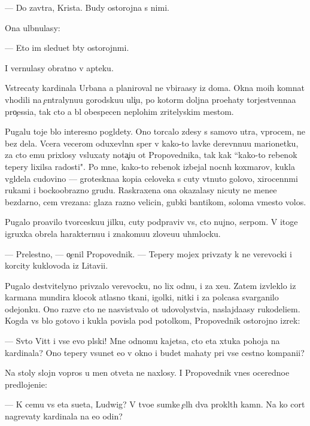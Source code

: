 \documentclass[10pt]{book}
\begin{document}
— Do zavtra, Krista. Budy ostorojna s nimi.

Ona ul{\yi}bnulasy:

— Eto im sledu{\y}et b{\yi}ty ostorojn{\yi}mi.

I vernulasy obratno v apteku.

Vstrecaty kardinala Urbana {\y}a planiroval ne v{\yi}bira{\y}asy iz doma. Okna mo{\y}ih komnat v{\yi}hodili na {\c}entralynu{\y}u gorodsku{\y}u uli{\c}u, po kotor{\yi}m doljna pro{\y}ehaty torjestvenna{\y}a pro{\c}essi{\y}a, tak cto {\y}a b{\yi}l obespecen neplohim zritelyskim mestom.

Pugalu toje b{\yi}lo interesno pogl{\ia}dety. Ono torcalo zdesy s samovo utra, vprocem, ne bez dela. Vcera vecerom oduxevl{\e}nn{\yi}{\y} sper v kako{\y}-to lavke derev{\ia}nnu{\y}u marionetku, za cto {\y}emu prixlosy v{\yi}sluxaty nota{\c}i{\y}u ot Propovednika, tak kak ``kako{\y}-to rebenok tepery lixilsa radosti". Po mne, kako{\y}-to rebenok izbejal nocn{\yi}h koxmarov, kukla v{\yi}gl{\ia}dela cudovi{\x}no — groteskna{\y}a kopi{\y}a celoveka s cuty v{\yi}t{\ia}nuto{\y} golovo{\y}, xirocenn{\yi}mi rukami i bockoobrazno{\y} grud{\y}u. Raskraxena ona okazalasy nicuty ne mene{\y}e bezdarno, cem v{\yi}rezana: glaza razno{\y} velicin{\yi}, gubki bantikom, soloma vmesto volos.

Pugalo pro{\y}avilo tvorcesku{\y}u jilku, cuty podpraviv vs{\e}, cto nujno, serpom. V itoge igruxka obrela harakternu{\y}u i znakomu{\y}u zlove{\x}u{\y}u uhm{\yi}locku.

— Prelestno, — o{\c}enil Propovednik. — Tepery mojex priv{\ia}zaty k ne{\y} verevocki i korcity kuklovoda iz Litavi{\y}i.

Pugalo de{\y}stvitelyno priv{\ia}zalo verevocku, no lix odnu, i za xe{\y}u. Zatem izvleklo iz karmana mundira klocok atlasno{\y} tkani, igolki, nitki i za polcasa svarganilo odejonku. Ono razve cto ne nasvist{\yi}valo ot udovolystvi{\y}a, naslajda{\y}asy rukodeli{\y}em. Kogda vs{\e} b{\yi}lo gotovo i kukla povisla pod potolkom, Propovednik ostorojno izrek:

— Sv{\ia}to{\y} Vitt i vse {\y}evo pl{\ia}ski! Mne odnomu kajetsa, cto eta xtuka pohoja na kardinala? Ono tepery v{\yi}sunet {\y}e{\y}o v okno i budet mahaty pri vse{\y} cestno{\y} kompani{\y}i?

Na stoly slojn{\yi}{\y} vopros u men{\ia} otveta ne naxlosy. I Propovednik vnes oceredno{\y}e predlojeni{\y}e:

— K cemu vs{\ia} eta su{\y}eta, Ludwig? V tvo{\y}e{\y} sumke {\c}el{\yi}h dva prokl{\ia}t{\yi}h kamn{\ia}. Na ko{\y} cort nagrevaty kardinala na {\y}e{\x}o odin?
\end{document}
